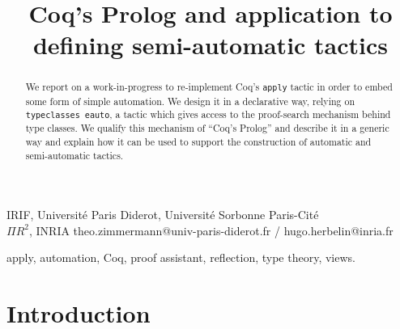 \documentclass[nocopyrightspace,blockstyle,numbers]{sigplanconf}
\begin{document}
\setlength{\pdfpageheight}{\paperheight}
\setlength{\pdfpagewidth}{\paperwidth}




\title{Coq's Prolog and application to defining semi-automatic tactics}

           {IRIF, Université Paris Diderot, Université Sorbonne Paris-Cité\\ $\Pi R ^2$, INRIA}
           {theo.zimmermann@univ-paris-diderot.fr / hugo.herbelin@inria.fr}

\maketitle

\begin{abstract}
  We report on a work-in-progress to re-implement Coq's \texttt{apply}
  tactic in order to embed some form of simple automation. We design
  it in a declarative way, relying on \texttt{typeclasses eauto}, a tactic
  which gives access to the proof-search mechanism behind type classes.
  We qualify this mechanism of ``Coq's Prolog'' and describe it in a
  generic way and explain how it can be used to support the
  construction of automatic and semi-automatic tactics.
\end{abstract}



\keywords
apply, automation, Coq, proof assistant, reflection,
type theory, views.

\section{Introduction}
\end{document}
